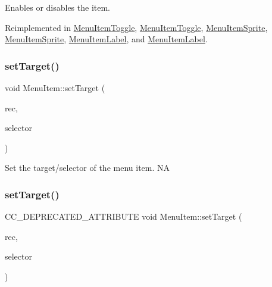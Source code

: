 Enables or disables the item. 

Reimplemented in \hyperlink{classMenuItemToggle_a987bb7ee9e97fb698aafebe74a86fd76}{Menu\+Item\+Toggle}, \hyperlink{classMenuItemToggle_a12277b632426398004b6588995e6d850}{Menu\+Item\+Toggle}, \hyperlink{classMenuItemSprite_ae64b755275632b2c8f4bae41a6b23287}{Menu\+Item\+Sprite}, \hyperlink{classMenuItemSprite_a09946218901edb83c5ba363d1029b61d}{Menu\+Item\+Sprite}, \hyperlink{classMenuItemLabel_afec86371e192df5410720aeb94cbc12e}{Menu\+Item\+Label}, and \hyperlink{classMenuItemLabel_a7297a6a7bf9e8f84d6cc783d4604adfd}{Menu\+Item\+Label}.

\mbox{\label{classMenuItem_aabf9ed107f5128035c62f5556f7b8af9}} 
\subsubsection{\texorpdfstring{set\+Target()}{setTarget()}\hspace{0.1cm}{\footnotesize\ttfamily [1/2]}}
{\footnotesize\ttfamily void Menu\+Item\+::set\+Target (\begin{DoxyParamCaption}\item[{\hyperlink{classRef}{Ref} $\ast$}]{rec,  }\item[{S\+E\+L\+\_\+\+Menu\+Handler}]{selector }\end{DoxyParamCaption})}

Set the target/selector of the menu item.  NA \mbox{\label{classMenuItem_a8741a2206467de455af86965f0ecfd86}} 
\subsubsection{\texorpdfstring{set\+Target()}{setTarget()}\hspace{0.1cm}{\footnotesize\ttfamily [2/2]}}
{\footnotesize\ttfamily C\+C\+\_\+\+D\+E\+P\+R\+E\+C\+A\+T\+E\+D\+\_\+\+A\+T\+T\+R\+I\+B\+U\+TE void Menu\+Item\+::set\+Target (\begin{DoxyParamCaption}\item[{\hyperlink{classRef}{Ref} $\ast$}]{rec,  }\item[{S\+E\+L\+\_\+\+Menu\+Handler}]{selector }\end{DoxyParamCaption})}

